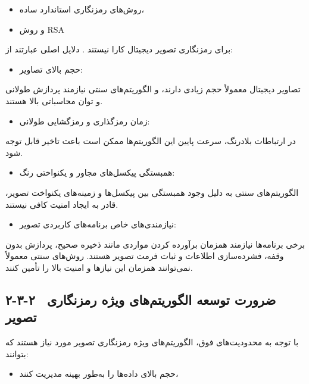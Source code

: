 \begin{itemize}
    \item روش‌های رمزنگاری استاندارد ساده،
\end{itemize}

\begin{itemize}
    \item و روش ‎RSA‎
\end{itemize}

برای رمزنگاری تصویر دیجیتال کارا نیستند \cite{ref40}. دلایل اصلی عبارتند از:

\begin{itemize}
    \item حجم بالای تصاویر:
\end{itemize}

تصاویر دیجیتال معمولاً حجم زیادی دارند، و الگوریتم‌های سنتی نیازمند پردازش طولانی و توان محاسباتی بالا هستند.

\begin{itemize}
    \item زمان رمزگذاری و رمزگشایی طولانی:
\end{itemize}

در ارتباطات بلادرنگ، سرعت پایین این الگوریتم‌ها ممکن است باعث تاخیر قابل توجه شود.

\begin{itemize}
    \item همبستگی پیکسل‌های مجاور و یکنواختی رنگ:
\end{itemize}

الگوریتم‌های سنتی به دلیل وجود همبستگی بین پیکسل‌ها و زمینه‌های یکنواخت تصویر، قادر به ایجاد امنیت کافی نیستند.

\begin{itemize}
    \item نیازمندی‌های خاص برنامه‌های کاربردی تصویر:
\end{itemize}

برخی برنامه‌ها نیازمند همزمان برآورده کردن مواردی مانند ذخیره صحیح، پردازش بدون وقفه، فشرده‌سازی اطلاعات و ثبات فرمت تصویر هستند. روش‌های سنتی معمولاً نمی‌توانند همزمان این نیازها و امنیت بالا را تأمین کنند.

\subsection{۲-۳-۲  ضرورت توسعه الگوریتم‌های ویژه رمزنگاری تصویر}

با توجه به محدودیت‌های فوق، الگوریتم‌های ویژه رمزنگاری تصویر مورد نیاز هستند که بتوانند:

\begin{itemize}
    \item حجم بالای داده‌ها را به‌طور بهینه مدیریت کنند،
\end{itemize}

